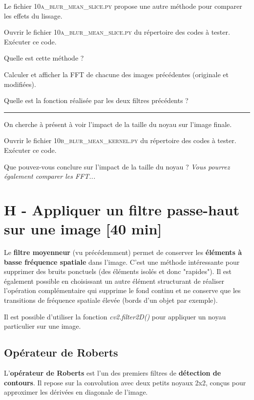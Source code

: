 Le fichier \textsc{10a\_blur\_mean\_slice.py} propose une autre méthode pour comparer les effets du lissage.

\Manip Ouvrir le fichier \textsc{10a\_blur\_mean\_slice.py} du répertoire des codes à tester. Exécuter ce code.

\Quest Quelle est cette méthode ? 

\Manip Calculer et afficher la FFT de chacune des images précédentes (originale et modifiées). 

\Quest Quelle est la fonction réalisée par les deux filtres précédents ?

\noindent \rule{\linewidth}{1pt}

On cherche à présent à voir l'impact de la taille du noyau sur l'image finale.

\Manip Ouvrir le fichier \textsc{10b\_blur\_mean\_kernel.py} du répertoire des codes à tester. Exécuter ce code.

\Quest Que pouvez-vous conclure sur l'impact de la taille du noyau ? \textit{Vous pourrez également comparer les FFT...}

\newpage

\section{H - Appliquer un filtre passe-haut sur une image {[40 min]}}


Le \textbf{filtre moyenneur} (vu précédemment) permet de conserver les \textbf{éléments à basse fréquence spatiale} dans l'image. C'est une méthode intéressante pour supprimer des bruits ponctuels (des éléments isolés et donc "rapides"). Il est également possible en choisissant un autre élément structurant de réaliser l'opération complémentaire qui supprime le fond continu et ne conserve que les transitions de fréquence spatiale élevée (bords d'un objet par exemple).

\medskip

Il est possible d'utiliser la fonction \textsl{cv2.filter2D()} pour appliquer un noyau particulier sur une image.

\subsection{Opérateur de Roberts}

L'\textbf{opérateur de Roberts} est l'un des premiers filtres de \textbf{détection de contours}. Il repose sur la convolution avec deux petits noyaux 2x2, conçus pour approximer les dérivées en diagonale de l'image.

